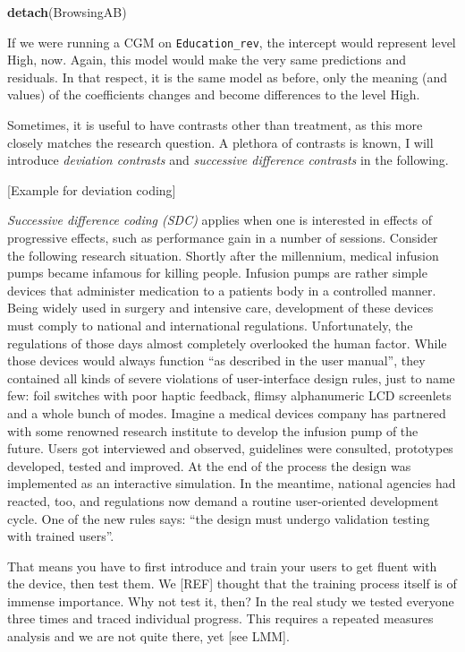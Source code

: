 \documentclass[]{svmono}
\newenvironment{Shaded}{\begin{snugshade}}{\end{snugshade}}
\newcommand{\KeywordTok}[1]{\textcolor[rgb]{0.13,0.29,0.53}{\textbf{#1}}}
\newcommand{\NormalTok}[1]{#1}
\theoremstyle{definition}
\theoremstyle{definition}
\theoremstyle{definition}
\theoremstyle{remark}
\begin{document}
\begin{Shaded}
\begin{Highlighting}[]
\KeywordTok{detach}\NormalTok{(BrowsingAB)}
\end{Highlighting}
\end{Shaded}

If we were running a CGM on \texttt{Education\_rev}, the intercept would
represent level High, now. Again, this model would make the very same
predictions and residuals. In that respect, it is the same model as
before, only the meaning (and values) of the coefficients changes and
become differences to the level High.

Sometimes, it is useful to have contrasts other than treatment, as this
more closely matches the research question. A plethora of contrasts is
known, I will introduce \emph{deviation contrasts} and \emph{successive
difference contrasts} in the following.

{[}Example for deviation coding{]}

\emph{Successive difference coding (SDC)} applies when one is interested
in effects of progressive effects, such as performance gain in a number
of sessions. Consider the following research situation. Shortly after
the millennium, medical infusion pumps became infamous for killing
people. Infusion pumps are rather simple devices that administer
medication to a patients body in a controlled manner. Being widely used
in surgery and intensive care, development of these devices must comply
to national and international regulations. Unfortunately, the
regulations of those days almost completely overlooked the human factor.
While those devices would always function ``as described in the user
manual'', they contained all kinds of severe violations of
user-interface design rules, just to name few: foil switches with poor
haptic feedback, flimsy alphanumeric LCD screenlets and a whole bunch of
modes. Imagine a medical devices company has partnered with some
renowned research institute to develop the infusion pump of the future.
Users got interviewed and observed, guidelines were consulted,
prototypes developed, tested and improved. At the end of the process the
design was implemented as an interactive simulation. In the meantime,
national agencies had reacted, too, and regulations now demand a routine
user-oriented development cycle. One of the new rules says: ``the design
must undergo validation testing with trained users''.

That means you have to first introduce and train your users to get
fluent with the device, then test them. We {[}REF{]} thought that the
training process itself is of immense importance. Why not test it, then?
In the real study we tested everyone three times and traced individual
progress. This requires a repeated measures analysis and we are not
quite there, yet {[}see LMM{]}.
\end{document}
